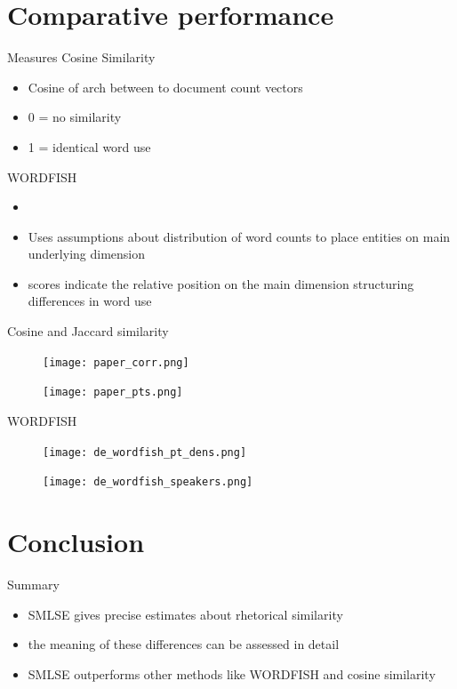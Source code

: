 \documentclass{beamer}
\begin{document}
\section{Comparative performance}
\begin{frame}{Measures}
    Cosine Similarity
    \begin{itemize}
        \item Cosine of arch between to document count vectors
        \item 0 = no similarity
        \item 1 = identical word use
    \end{itemize}\medskip
    WORDFISH
    \begin{itemize}
        \item \cite{Slapin2008}
        \item Uses assumptions about distribution of word counts to place entities on main underlying dimension
        \item scores indicate the relative position on the main dimension structuring differences in word use
    \end{itemize}
\end{frame}

\begin{frame}[allowframebreaks]{Cosine and Jaccard similarity}
    \begin{figure}
        \centering
        \texttt{[image: paper\_corr.png]}
    \end{figure}
    \begin{figure}
        \centering
        \texttt{[image: paper\_pts.png]}
    \end{figure}
\end{frame}

\begin{frame}[allowframebreaks]{WORDFISH}
\begin{figure}
    \centering
    \texttt{[image: de\_wordfish\_pt\_dens.png]}
\end{figure}
\begin{figure}
    \centering
    \texttt{[image: de\_wordfish\_speakers.png]}
\end{figure}
\end{frame}


\section{Conclusion}
\begin{frame}{Summary}
\begin{itemize}
    \item SMLSE gives precise estimates about rhetorical similarity
    \item the meaning of these differences can be assessed in detail
    \item SMLSE outperforms other methods like WORDFISH and cosine similarity
\end{itemize}
\end{frame}
\end{document}
